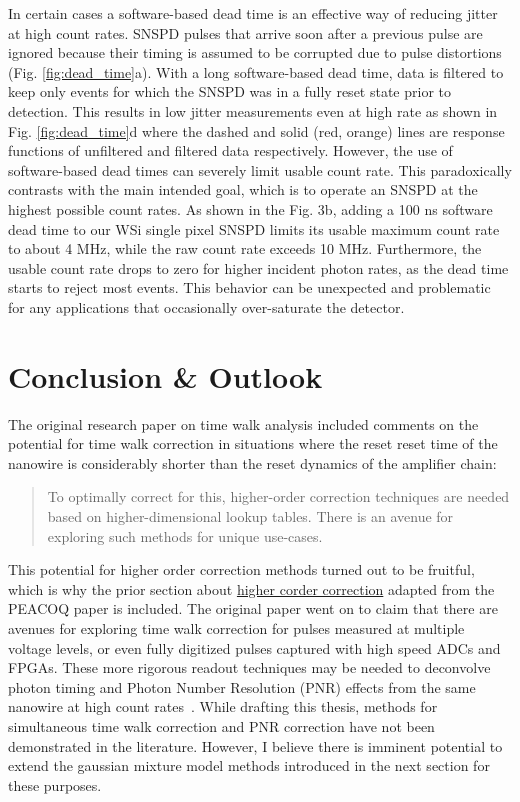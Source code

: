 \documentclass[11pt]{caltech_thesis} %
\begin{document}
In certain cases a software-based dead time is an effective way of reducing jitter at high count rates. SNSPD pulses that arrive soon after a previous pulse are ignored because their timing is assumed to be corrupted due to pulse distortions (Fig. \ref{fig:dead_time}a). With a long software-based dead time, data is filtered to keep only events for which the SNSPD was in a fully reset state prior to detection. This results in low jitter measurements even at high rate as shown in Fig. \ref{fig:dead_time}d where the dashed and solid (red, orange) lines are response functions of unfiltered and filtered data respectively. However, the use of software-based dead times can severely limit usable count rate. This paradoxically contrasts with the main intended goal, which is to operate an SNSPD at the highest possible count rates. As shown in the Fig. 3b, adding a 100 ns software dead time to our WSi single pixel SNSPD limits its usable maximum count rate to about 4 MHz, while the raw count rate exceeds 10 MHz. Furthermore, the usable count rate drops to zero for higher incident photon rates, as the dead time starts to reject most events. This behavior can be unexpected and problematic for any applications that occasionally over-saturate the detector.

\hypertarget{conclusion-outlook}{%
\section{Conclusion \& Outlook}\label{conclusion-outlook}}

The original research paper on time walk analysis \autocite{Mueller2023} included comments on the potential for time walk correction in situations where the reset reset time of the nanowire is considerably shorter than the reset dynamics of the amplifier chain:

\begin{quote}
To optimally correct for this, higher-order correction techniques are needed based on higher-dimensional lookup tables. There is an avenue for exploring such methods for unique use-cases. \autocite{Mueller2023}
\end{quote}

This potential for higher order correction methods turned out to be fruitful, which is why the prior section about \href{section_05_extensions_supplemental.md\#higher-order-correction}{higher corder correction} adapted from the PEACOQ paper \autocite{Craiciu23} is included. The original paper went on to claim that there are avenues for exploring time walk correction for pulses measured at multiple voltage levels, or even fully digitized pulses captured with high speed ADCs and FPGAs. These more rigorous readout techniques may be needed to deconvolve photon timing and Photon Number Resolution (PNR) effects from the same nanowire at high count rates~\autocite{Hao2021}. While drafting this thesis, methods for simultaneous time walk correction and PNR correction have not been demonstrated in the literature. However, I believe there is imminent potential to extend the gaussian mixture model methods introduced in the next section for these purposes.
\end{document}
